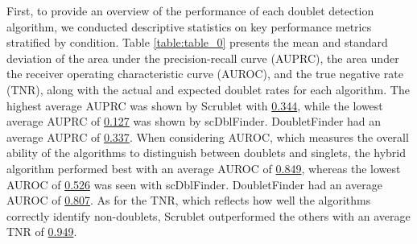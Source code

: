 \documentclass[11pt]{article}
\begin{document}
First, to provide an overview of the performance of each doublet detection algorithm, we conducted descriptive statistics on key performance metrics stratified by condition. Table \ref{table:table_0} presents the mean and standard deviation of the area under the precision-recall curve (AUPRC), the area under the receiver operating characteristic curve (AUROC), and the true negative rate (TNR), along with the actual and expected doublet rates for each algorithm. The highest average AUPRC was shown by Scrublet with \hyperlink{A0b}{0.344}, while the lowest average AUPRC of \hyperlink{A0d}{0.127} was shown by scDblFinder. DoubletFinder had an average AUPRC of \hyperlink{A0a}{0.337}. When considering AUROC, which measures the overall ability of the algorithms to distinguish between doublets and singlets, the hybrid algorithm performed best with an average AUROC of \hyperlink{A1c}{0.849}, whereas the lowest AUROC of \hyperlink{A1d}{0.526} was seen with scDblFinder. DoubletFinder had an average AUROC of \hyperlink{A1a}{0.807}. As for the TNR, which reflects how well the algorithms correctly identify non-doublets, Scrublet outperformed the others with an average TNR of \hyperlink{A2b}{0.949}.
\end{document}

